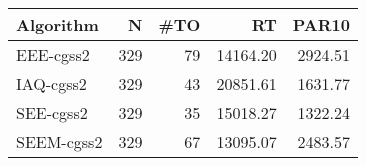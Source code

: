 \begin{tabular}{lrrrr}
\toprule
 Algorithm &   N &  \#TO &       RT &   PAR10 \\
\midrule
 EEE-cgss2 & 329 &   79 & 14164.20 & 2924.51 \\
 IAQ-cgss2 & 329 &   43 & 20851.61 & 1631.77 \\
 SEE-cgss2 & 329 &   35 & 15018.27 & 1322.24 \\
SEEM-cgss2 & 329 &   67 & 13095.07 & 2483.57 \\
\bottomrule
\end{tabular}

